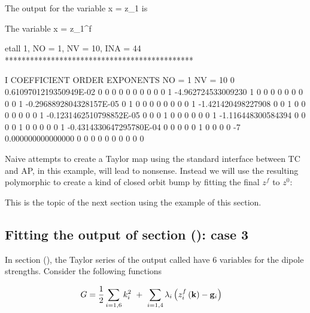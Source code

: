 \documentclass{hitec}     %
\begin{document}
{{ The output for the  variable x = z_1 is 

\begin{code}

 The variable x = z_1^f

 etall    1, NO =    1, NV =   10, INA =   44
 *********************************************

    I  COEFFICIENT          ORDER   EXPONENTS
      NO =     1      NV =    10
   0  0.6109701219350949E-02   0  0  0  0  0  0  0  0  0  0
   1  -4.962724533009230       1  0  0  0  0  0  0  0  0  0
   1 -0.2968892804328157E-05   0  1  0  0  0  0  0  0  0  0
   1  -1.421420498227908       0  0  1  0  0  0  0  0  0  0
   1 -0.1231462510798852E-05   0  0  0  1  0  0  0  0  0  0
   1  -1.116448300584394       0  0  0  0  1  0  0  0  0  0
   1 -0.4314330647295780E-04   0  0  0  0  0  1  0  0  0  0
    -7   0.000000000000000       0  0  0  0  0  0  0  0  0  0   
\end{code}
\renewcommand{\codefont}{\small}

Naive attempts to create a Taylor map using the standard interface between TC and AP, in this example, will  lead to nonsense. Instead we will use the resulting  polymorphic  to create a kind of closed orbit bump by fitting the final $z^f$ to $z^0$:



This is the topic of the next section using the  example of this section.

 \subsection{Fitting the output of section (\protect{}): case 3}\label{s:lagmap}

In section   (), the Taylor series of the output   called   have 6 variables for the dipole strengths. Consider the following functions 
 
%
\begin{align} G&={1 \over 2}\sum\limits_{i=
1,6}^{} {k}_{i}^{2}\ +\ \sum\limits_{i=
1,4}^{} {\lambda }_{i}\left({{z}_{i}^{f}\left({{\bf k}}\right) - {{\bf g}}_{i}}\right) \label{eq:lang}\end{align}


}}
\end{document}
